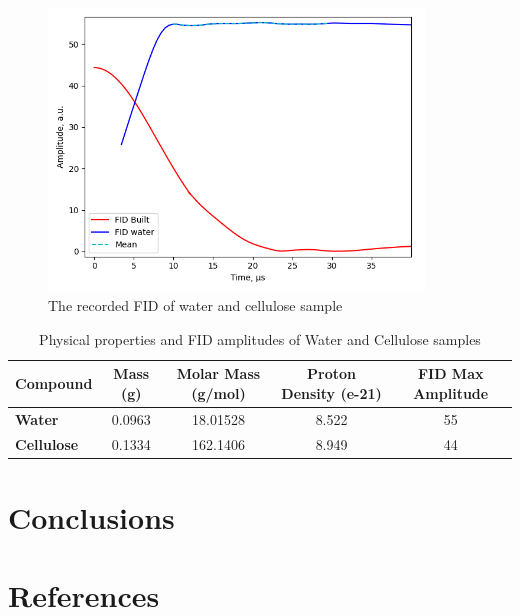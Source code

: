 \documentclass[a4paper,12pt]{article}
\begin{document}
\begin{figure}[H]
  \centering
  \includegraphics[width=10cm]{images/Water_Cell_FID.png}
  \caption{The recorded FID of water and cellulose sample}
  \label{fig:Water_Cell_FID}
\end{figure}

\begin{table}[h]
  \centering
  \begin{tabular}{|l|c|c|c|c|}
  \hline
  \textbf{Compound} & \textbf{Mass (g)} & \textbf{Molar Mass (g/mol)} & \textbf{Proton Density (e-21)} & \textbf{FID Max Amplitude} \\ \hline
  \textbf{Water}    & 0.0963            & 18.01528                    & 8.522                         & 55                         \\ \hline
  \textbf{Cellulose} & 0.1334           & 162.1406                    & 8.949                         & 44                         \\ \hline
  \end{tabular}
  \caption{Physical properties and FID amplitudes of Water and Cellulose samples}
  \label{tab:fid_data}
  \end{table}
  

\newpage
\section{Conclusions}

\newpage
\section{References}
\printbibliography
\end{document}
